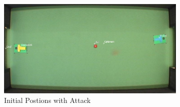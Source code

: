 \documentclass[conference,12pt]{IEEEtran}
\begin{document}
\clearpage 

\begin{figure}[htp]
\begin{center}
\leavevmode
\includegraphics[width=0.8\textwidth] {initial2.jpg}
\end{center}
\caption{Initial Postions with Attack}
\label{fig:initial2}
\end{figure}
\end{document}
